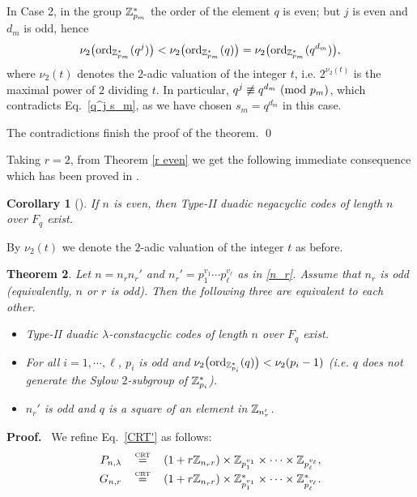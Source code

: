 \documentclass{article}
\newtheorem{Theorem}{Theorem}[section]
\newtheorem{Corollary}[Theorem]{Corollary}
\numberwithin{equation}{section}
\numberwithin{table}{section}
\def\Z{{\Bbb Z}}
\def\pf{\par{\bf Proof.}~ }
\def\CRT{\,\mathop{=}\limits^{\mbox{\rm\tiny CRT}}\,}
\begin{document}
In Case 2, in the group $\Z_{p_m}^*$ the order of the element $q$ is even;
but $j$ is even and $d_m$ is odd, hence
$$\nu_2\big({\rm ord}_{\Z_{p_m}^*}(q^j)\big)
  <\nu_2\big({\rm ord}_{\Z_{p_m}^*}(q)\big)=
  \nu_2\big({\rm ord}_{\Z_{p_m}^*}(q^{d_m})\big),
$$
where $\nu_2(t)$ denotes the $2$-adic valuation of the integer $t$, i.e.
$2^{\nu_2(t)}$ is the maximal power of $2$ dividing $t$.
In particular, $q^j\not\equiv q^{d_m}~({\rm mod}~{p_m})$, which
contradicts Eq.~\eqref{q^j s_m}, as we have chosen $s_m=q^{d_m}$
in this case.

The contradictions finish the proof of the theorem.
\qed

\medskip
Taking $r=2$, from Theorem \ref{r even}
we get the following immediate consequence
which has been proved in \cite{Bl08}.


\begin{Corollary}[\cite{Bl08}] If $n$ is even, then
Type-II duadic negacyclic codes of length $n$ over $F_q$ exist.
\end{Corollary}

By $\nu_2(t)$ we denote the $2$-adic valuation of the integer $t$ as before.

\begin{Theorem}\label{r odd}
Let $n=n_rn_r'$ and $n_r'=p_1^{v_1}\cdots p_{\ell}^{v_\ell}$ 
as in \eqref{n_r}.
Assume that $n_r$ is odd (equivalently, $n$ or $r$ is odd).
Then the following three are equivalent to each other.
\begin{itemize}
\item[(i)]
Type-II duadic $\lambda$-constacyclic codes of length $n$ over $F_q$ exist.
\item[(ii)]
 For all $i=1,\cdots,\ell$, $p_i$ is odd and
 $\nu_2\big({\rm ord}_{\Z_{p_i}^*}(q)\big)<\nu_2(p_i-1)$
 (i.e. $q$ does not generate the Sylow $2$-subgroup of $\Z_{p_i}^*$).
\item[(iii)]
  $n_r'$ is odd and $q$ is a square of an element in $\Z_{n_r'}$.
\end{itemize}
\end{Theorem}

\pf
We refine Eq.~\eqref{CRT'} as follows:
\begin{equation}\label{CRT''}
\begin{array}{rcl}
P_{n,\lambda}&\CRT & (1+r\Z_{n_r r})\times
  \Z_{p_1^{v_1}}\times\cdots\times\Z_{p_\ell^{v_\ell}},\\[3pt]
G_{n,r}  &\CRT& (1+r\Z_{n_r r})
 \times \Z_{p_1^{v_1}}^*\times\cdots\times\Z_{p_\ell^{v_\ell}}^*.
\end{array}
\end{equation}
\end{document}
